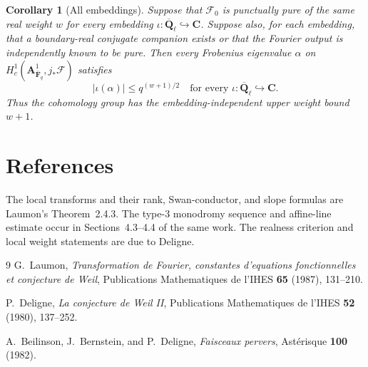 \documentclass[10pt]{article}
\newtheorem{corollary}[theorem]{Corollary}
\theoremstyle{definition}
\newcommand{\Fbar}{\overline{\mathbf F}_q}
\newcommand{\Qlb}{\overline{\mathbf Q}_\ell}
\newcommand{\Aone}{\mathbf A^1}
\begin{document}
\begin{corollary}[All embeddings]
Suppose that \(\mathcal F_0\) is punctually pure of the same real weight
\(w\) for every embedding
\(\iota:\Qlb\hookrightarrow\mathbf C\).  Suppose also, for each
embedding, that a boundary-real conjugate companion exists or that the
Fourier output is independently known to be pure.  Then every Frobenius
eigenvalue \(\alpha\) on
\(H_c^1(\Aone_{\Fbar},j_*\mathcal F)\) satisfies
\[
 |\iota(\alpha)|\le q^{(w+1)/2}
 \quad\text{for every }\iota:\Qlb\hookrightarrow\mathbf C.
\]
Thus the cohomology group has the embedding-independent upper weight bound
\(w+1\).
\end{corollary}

\section{References}

The local transforms and their rank, Swan-conductor, and slope formulas are
Laumon's Theorem~2.4.3.  The type-3 monodromy sequence and affine-line
estimate occur in Sections~4.3--4.4 of the same work.  The realness criterion
and local weight statements are due to Deligne.

\begin{thebibliography}{9}
G.~Laumon,
\emph{Transformation de Fourier, constantes d'equations fonctionnelles et
conjecture de Weil},
Publications Mathematiques de l'IHES \textbf{65} (1987), 131--210.

P.~Deligne,
\emph{La conjecture de Weil II},
Publications Mathematiques de l'IHES \textbf{52} (1980), 137--252.

A.~Beilinson, J.~Bernstein, and P.~Deligne,
\emph{Faisceaux pervers},
Ast\'erisque \textbf{100} (1982).
\end{thebibliography}
\end{document}
